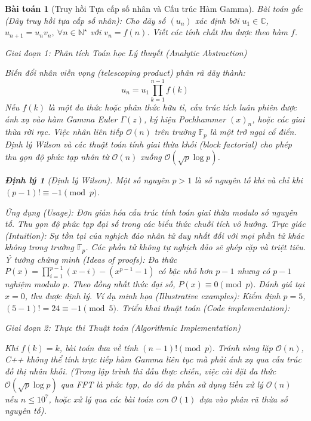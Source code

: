\documentclass{article}
\newtheorem{baitoan}{Bài toán}
\newtheorem{dinhly}{Định lý}
\begin{document}
\begin{baitoan}[Truy hồi Tựa cấp số nhân và Cấu trúc Hàm Gamma]
 \emph{Bài toán gốc (Dãy truy hồi tựa cấp số nhân):} 
 Cho dãy số $(u_n)$ xác định bởi $u_1\in\mathbb{C}$, $u_{n+1} = u_n v_n,\ \forall n\in\mathbb{N}^\star$ với $v_n = f(n)$.
 Viết các tính chất thu được theo hàm $f$.

\vspace{0.5em}\noindent\emph{Giai đoạn 1: Phân tích Toán học Lý thuyết (Analytic Abstraction)}
 
 Biến đổi nhân viễn vọng (telescoping product) phân rã dãy thành:
 \begin{equation}
 u_n = u_1 \prod_{k=1}^{n-1} f(k)
 \end{equation}
 Nếu $f(k)$ là một đa thức hoặc phân thức hữu tỉ, cấu trúc tích luân phiên được ánh xạ vào hàm Gamma Euler $\Gamma(z)$, ký hiệu Pochhammer $(x)_n$, hoặc các giai thừa rời rạc. Việc nhân liên tiếp $\mathcal{O}(n)$ trên trường $\mathbb{F}_p$ là một trở ngại cổ điển. Định lý Wilson và các thuật toán tính giai thừa khối (block factorial) cho phép thu gọn độ phức tạp nhân từ $\mathcal{O}(n)$ xuống $\mathcal{O}(\sqrt{p} \log p)$.

\begin{dinhly}[Định lý Wilson]
Một số nguyên $p > 1$ là số nguyên tố khi và chỉ khi $(p-1)! \equiv -1 \pmod p$.
\end{dinhly}
\emph{Ứng dụng (Usage):} Đơn giản hóa cấu trúc tính toán giai thừa modulo số nguyên tố. Thu gọn độ phức tạp đại số trong các biểu thức chuỗi tích vô hướng.
\emph{Trực giác (Intuition):} Sự tồn tại của nghịch đảo nhân tử duy nhất đối với mọi phần tử khác không trong trường $\mathbb{F}_p$. Các phần tử không tự nghịch đảo sẽ ghép cặp và triệt tiêu.
\emph{Ý tưởng chứng minh (Ideas of proofs):} Đa thức $P(x) = \prod_{i=1}^{p-1}(x-i) - (x^{p-1}-1)$ có bậc nhỏ hơn $p-1$ nhưng có $p-1$ nghiệm modulo $p$. Theo đồng nhất thức đại số, $P(x) \equiv 0 \pmod p$. Đánh giá tại $x=0$, thu được định lý.
\emph{Ví dụ minh họa (Illustrative examples):} Kiểm định $p=5$, $(5-1)! = 24 \equiv -1 \pmod 5$.
\emph{Triển khai thuật toán (Code implementation):}



\vspace{0.5em}\noindent\emph{Giai đoạn 2: Thực thi Thuật toán (Algorithmic Implementation)}
 
 Khi $f(k) = k$, bài toán đưa về tính $(n-1)! \pmod p$. Tránh vòng lặp $\mathcal{O}(n)$, C++ không thể tính trực tiếp hàm Gamma liên tục mà phải ánh xạ qua cấu trúc đồ thị nhân khối.
 \textit{(Trong lập trình thi đấu thực chiến, việc cài đặt đa thức $\mathcal{O}(\sqrt{p} \log p)$ qua FFT là phức tạp, do đó đa phần sử dụng tiền xử lý $\mathcal{O}(n)$ nếu $n \le 10^7$, hoặc xử lý qua các bài toán con $\mathcal{O}(1)$ dựa vào phân rã thừa số nguyên tố).}


\end{baitoan}
\end{document}
